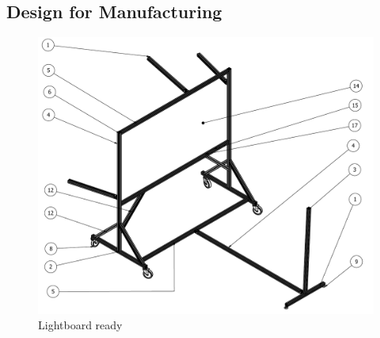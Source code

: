 \documentclass[a4paper]{jpconf}
\begin{document}
\subsection{Design for Manufacturing}



\begin{figure}
	\centering
	\includegraphics[width=1\linewidth]{frame1.pdf}
	\caption{Lightboard ready}
	\label{fig:Finalprodotype}
\end{figure}
\end{document}
